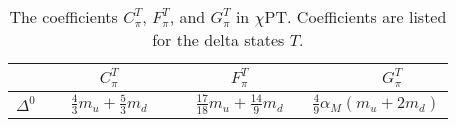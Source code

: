 \documentclass[12pt,tightenlines, raggedbottom, prd, notitlepage]{revtex4-1}
\def\CPT{{$\chi$PT}}
\begin{document}
\begin{table}
    \caption{The coefficients $C_\pi^T$, $F_\pi^T$, and $G_\pi^T$ in \CPT. Coefficients are
    listed for the delta states $T$.}
    \begin{tabular}{l | c c c }
     & $\quad \quad \quad C_\pi^T \quad \quad \quad $  
     & $\quad \quad \quad F_\pi^T \quad \quad \quad$ 
     & $\quad \quad \quad G_\pi^T  \quad  $ \\
    \hline
    $\Delta^0$    
     & $\frac{4}{3} m_u + \frac{5}{3} m_d$  
     & $\frac{17}{18} m_u + \frac{14}{9} m_d$ 
     & $\frac{4}{9} \alpha_M (m_u + 2 m_d)$\\
     \end{tabular}
    \label{t:QCD-C}
\end{table}
\end{document}
